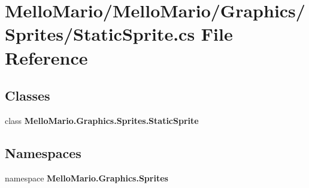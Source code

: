 \section{Mello\+Mario/\+Mello\+Mario/\+Graphics/\+Sprites/\+Static\+Sprite.cs File Reference}
\label{StaticSprite_8cs}
\subsection*{Classes}
\begin{DoxyCompactItemize}
\item 
class \textbf{ Mello\+Mario.\+Graphics.\+Sprites.\+Static\+Sprite}
\end{DoxyCompactItemize}
\subsection*{Namespaces}
\begin{DoxyCompactItemize}
\item 
namespace \textbf{ Mello\+Mario.\+Graphics.\+Sprites}
\end{DoxyCompactItemize}
